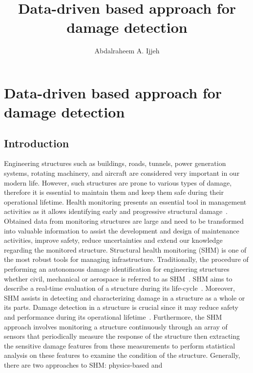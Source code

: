 \documentclass[b5paper, 11pt, openany, titlepage]{book}
\begin{document}


\title{Data-driven based approach for damage detection}
\author{Abdalraheem A. Ijjeh}
\maketitle
\tableofcontents
\chapter[Data-driven techniques for damage detection]{Data-driven based approach for damage detection}
\section{Introduction}
Engineering structures such as buildings, roads, tunnels, power generation systems, rotating machinery, and aircraft are considered very important in our modern life.
However, such structures are prone to various types of damage, therefore it is essential to maintain them and keep them safe during their operational lifetime.
Health monitoring presents an essential tool in management activities as it allows identifying early and progressive structural damage~\cite{farrar2007introduction}. 
Obtained data from monitoring structures are large and need to be transformed into valuable information to assist the development and design of maintenance activities, improve safety, reduce uncertainties and extend our knowledge regarding the monitored structure.
Structural health monitoring (SHM) is one of the most robust
tools for managing infrastructure.
Traditionally, the procedure of performing an autonomous damage identification for engineering structures whether civil, mechanical or aerospace is referred to as SHM~\cite{farrar2001vibration}.
SHM aims to describe a real-time evaluation of a structure during its life-cycle~\cite{Balageas2010}. 
Moreover, SHM assists in detecting and characterizing damage in a structure as a whole or its parts. 
Damage detection in a structure is crucial since it may reduce safety and performance during its operational lifetime~\cite{Yuan2016}.
Furthermore, the SHM approach involves monitoring a structure continuously through an array of sensors that periodically measure the response of the structure then extracting the sensitive damage features from these measurements to perform statistical analysis on these features to examine the condition of the structure.
Generally, there are two approaches to SHM: physics-based and
\end{document}
